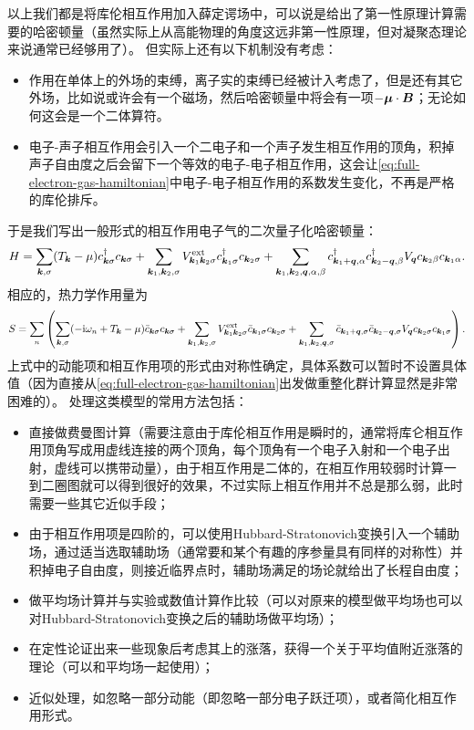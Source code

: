 \documentclass[hyperref, UTF8, a4paper]{ctexart}
\newcommand*{\ii}{\mathrm{i}}
\begin{document}
以上我们都是将库伦相互作用加入薛定谔场中，可以说是给出了第一性原理计算需要的哈密顿量（虽然实际上从高能物理的角度这远非第一性原理，但对凝聚态理论来说通常已经够用了）。
但实际上还有以下机制没有考虑：
\begin{itemize}
    \item 作用在单体上的外场的束缚，离子实的束缚已经被计入考虑了，但是还有其它外场，比如说或许会有一个磁场，然后哈密顿量中将会有一项$-\vb*{\mu} \cdot \vb*{B}$；无论如何这会是一个二体算符。
    \item 电子-声子相互作用会引入一个二电子和一个声子发生相互作用的顶角，积掉声子自由度之后会留下一个等效的电子-电子相互作用，这会让\eqref{eq:full-electron-gas-hamiltonian}中电子-电子相互作用的系数发生变化，不再是严格的库伦排斥。
\end{itemize}
于是我们写出一般形式的相互作用电子气的二次量子化哈密顿量：
\begin{equation}
    {H} = \sum_{\vb*{k}, \sigma} (T_{\vb*{k}} - \mu) {c}^\dagger_{\vb*{k} \sigma} {c}_{\vb*{k} \sigma} 
    + \sum_{\vb*{k}_1, \vb*{k}_2, \sigma} V^\text{ext}_{\vb*{k}_1 \vb*{k}_2 \sigma} {c}^\dagger_{\vb*{k}_1 \sigma} {c}_{\vb*{k}_2 \sigma}
    + \sum_{\vb*{k}_1, \vb*{k}_2, \vb*{q}, \alpha, \beta} {c}^\dagger_{\vb*{k}_1+\vb*{q}, \alpha} {c}^\dagger_{\vb*{k}_2-\vb*{q}, \beta} V_{\vb*{q}} {c}_{\vb*{k}_2 \beta} {c}_{\vb*{k}_1 \alpha}. 
\end{equation}
相应的，热力学作用量为
\begin{equation}
    S = \sum_n \left( 
        \sum_{\vb*{k}, \sigma} (-\ii \omega_n + T_{\vb*{k}} - \mu) \bar{c}_{\vb*{k} \sigma} c_{\vb*{k} \sigma} 
        + \sum_{\vb*{k}_1, \vb*{k}_2, \sigma} V^\text{ext}_{\vb*{k}_1 \vb*{k}_2 \sigma} \bar{c}_{\vb*{k}_1 \sigma} c_{\vb*{k}_2 \sigma} 
        + \sum_{\vb*{k}_1, \vb*{k}_2, \vb*{q}, \sigma} \bar{c}_{\vb*{k}_1+\vb*{q}, \sigma} \bar{c}_{\vb*{k}_2-\vb*{q}, \sigma} V_{\vb*{q}} c_{\vb*{k}_2 \sigma} c_{\vb*{k}_1 \sigma} \right). 
\end{equation}
上式中的动能项和相互作用项的形式由对称性确定，具体系数可以暂时不设置具体值（因为直接从\eqref{eq:full-electron-gas-hamiltonian}出发做重整化群计算显然是非常困难的）。
处理这类模型的常用方法包括：
\begin{itemize}
    \item 直接做费曼图计算（需要注意由于库伦相互作用是瞬时的，通常将库仑相互作用顶角写成用虚线连接的两个顶角，每个顶角有一个电子入射和一个电子出射，虚线可以携带动量），由于相互作用是二体的，在相互作用较弱时计算一到二圈图就可以得到很好的效果，不过实际上相互作用并不总是那么弱，此时需要一些其它近似手段；
    \item 由于相互作用项是四阶的，可以使用Hubbard-Stratonovich变换引入一个辅助场，通过适当选取辅助场（通常要和某个有趣的序参量具有同样的对称性）并积掉电子自由度，则接近临界点时，辅助场满足的场论就给出了长程自由度；
    \item 做平均场计算并与实验或数值计算作比较（可以对原来的模型做平均场也可以对Hubbard-Stratonovich变换之后的辅助场做平均场）；
    \item 在定性论证出来一些现象后考虑其上的涨落，获得一个关于平均值附近涨落的理论（可以和平均场一起使用）；
    \item 近似处理，如忽略一部分动能（即忽略一部分电子跃迁项），或者简化相互作用形式。
\end{itemize}
\end{document}
